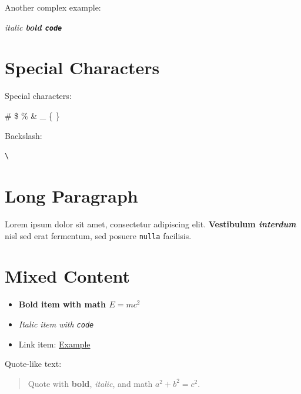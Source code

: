 \documentclass{article}
\begin{document}
Another complex example:

\textit{italic \textbf{bold \texttt{code}}}

\section{Special Characters}

Special characters:

\# \$ \% \& \_ \{ \}

Backslash:

\texttt{\textbackslash}

\section{Long Paragraph}

Lorem ipsum dolor sit amet, consectetur adipiscing elit. 
\textbf{Vestibulum \textit{interdum}} nisl sed erat fermentum,
sed posuere \texttt{nulla} facilisis.

\section{Mixed Content}

\begin{itemize}
\item \textbf{Bold item with math $E=mc^2$}
\item \textit{Italic item with \texttt{code}}
\item Link item: \href{https://example.com}{Example}
\end{itemize}

Quote-like text:

\begin{quote}
Quote with \textbf{bold}, \textit{italic}, and math $a^2+b^2=c^2$.
\end{quote}
\end{document}
